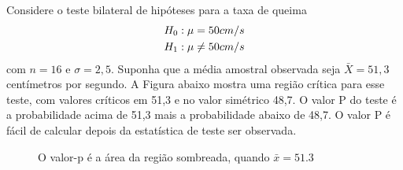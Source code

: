 \documentclass[14pt,aspectratio=1610]{beamer}
\begin{document}
\begin{frame}{}
\frametitle{}
\begin{block}{}
\justifying
Considere o teste bilateral de hipóteses para a taxa de queima
\begin{align*}
\centering
H_{0}: \mu&=50 cm/s\\
H_{1}:\mu &\neq 50 cm/s
\end{align*}
com $n = 16$ e $\sigma = 2,5.$ Suponha que a média amostral observada seja $\bar{X}= 51,3$ centímetros por segundo. A Figura abaixo mostra uma região crítica 
para esse teste, com valores críticos em 51,3 e no valor simétrico 48,7. O valor P do teste é a probabilidade acima de 51,3 mais a probabilidade abaixo de 48,7. O valor 
P é fácil de calcular depois da estatística de teste ser observada.
\end{block}
\end{frame}

\begin{frame}{}
\begin{figure}
\centering
{}
\caption{O valor-p é a área da região sombreada, quando $\bar{x}=51.3$}
\end{figure}
\end{frame}
\end{document}
